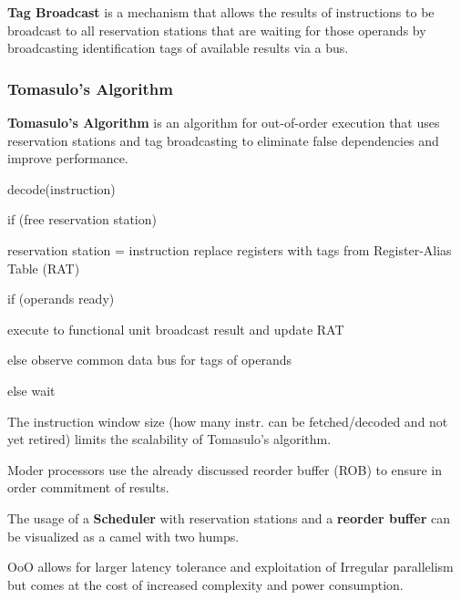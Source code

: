 \begin{definition}
	\textbf{Tag Broadcast} is a mechanism that allows the results of instructions to be broadcast to all reservation stations that are waiting for those operands by broadcasting identification tags of available results via a bus.
\end{definition}

\subsubsection{Tomasulo's Algorithm}

\begin{definition}
	\textbf{Tomasulo's Algorithm} is an algorithm for out-of-order execution that uses reservation stations and tag broadcasting to eliminate false dependencies and improve performance.
\end{definition}

\begin{algorithm}
	decode(instruction)

	if (free reservation station) {

			reservation station = instruction
			replace registers with tags from Register-Alias Table (RAT)

			if (operands ready) {

					execute to functional unit
					broadcast result and update RAT

				} else {
					observe common data bus for tags of operands
				}

		} else {
			wait
		}
\end{algorithm}

\begin{important}
	The instruction window size (how many instr. can be fetched/decoded and not yet retired) limits the scalability of Tomasulo's algorithm.
\end{important}

\begin{remark}
	Moder processors use the already discussed reorder buffer (ROB) to ensure in order commitment of results.
\end{remark}

\begin{remark}
	The usage of a \textbf{Scheduler} with reservation stations and a \textbf{reorder buffer} can be visualized as a camel with two humps.
\end{remark}

\begin{remark}
	OoO allows for larger latency tolerance and exploitation of Irregular parallelism but comes at the cost of increased complexity and power consumption.
\end{remark}

